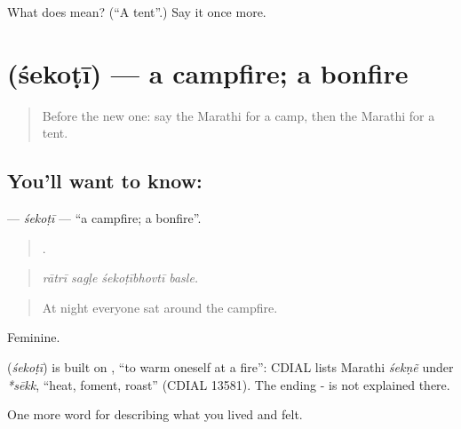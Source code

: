 \begin{tcolorbox}[breakable,colback=teal!4,colframe=teal!35!black,title={Before you move on}]
What does  mean? (\textquotedblleft{}A tent\textquotedblright{}.) Say it once more.
\end{tcolorbox}
\section[\texorpdfstring{\mr{शेकोटी} (śekoṭī)}{शेकोटी (śekoṭī)}]{ (śekoṭī) — a campfire; a bonfire}

\label{lesson:MR-C534-sekoti}



\begin{quote}
Before the new one: say the Marathi for a camp, then the Marathi for a tent.
\end{quote}

\subsection*{You'll want to know: }
\textbf{} — \emph{śekoṭī} — \textquotedblleft{}a campfire; a bonfire\textquotedblright{}.

\begin{quote}
   .
\end{quote}

\begin{quote}
\emph{rātrī sagḷe śekoṭībhovtī basle.}
\end{quote}

\begin{quote}
At night everyone sat around the campfire.
\end{quote}

Feminine.

\begin{cousinweb}
\textbf{} (\emph{śekoṭī}) is built on , \textquotedblleft{}to warm oneself at a fire\textquotedblright{}: CDIAL lists Marathi \emph{śekṇẽ} under \emph{*sēkk}, \textquotedblleft{}heat, foment, roast\textquotedblright{} (CDIAL 13581). The ending - is not explained there.
\end{cousinweb}

\begin{grammarlens}[title={What you've built}]
One more word for describing what you lived and felt.
\end{grammarlens}

